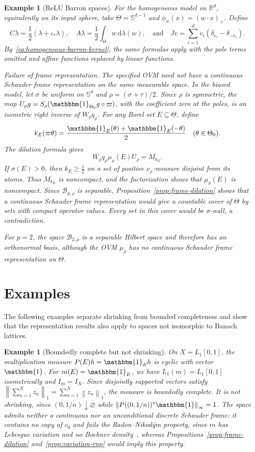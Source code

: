 \documentclass[11pt,leqno]{amsart}
\theoremstyle{compact}
\numberwithin{equation}{section}
\theoremstyle{compactremark}
\newtheorem{example}[theorem]{Example}
\theoremstyle{compact}
\newcommand{\1}{\mathbbm{1}}
\newcommand{\rmd}{\mathrm{d}}
\newcommand{\R}{\mathbb{R}}
\newcommand{\norm}[1]{\left\|#1\right\|}
\begin{document}
\begin{example}[ReLU Barron spaces]
For the homogeneous model on $\R^d$, equivalently on its input sphere, take $\Theta=\mathbb S^{d-1}$ and $\phi_w(x)=(w\cdot x)_+$. Define
\[
C\lambda=\frac{1}{2}(\lambda+\iota_*\lambda),\quad
A\lambda=\frac{1}{2}\int_\Theta w\,\rmd\lambda(w),\quad\text{and}\quad
Jv=\sum_{i=1}^dv_i(\delta_{e_i}-\delta_{-e_i}).
\]
By~\eqref{eq:homogeneous-barron-kernel}, the same formulas apply with the pole terms omitted and affine functions replaced by linear functions.

\textit{Failure of frame representation.}
\begingroup
The specified OVM need not have a continuous Schauder frame representation on the same measurable space. In the biased model, let $\sigma$ be uniform on $\mathbb S^d$ and $\rho=(\sigma+\tau)/2$. Since $\rho$ is symmetric, the map $U_\rho g=S_\rho(\1_{\Theta_0}g\circ\varpi)$, with the coefficient zero at the poles, is an isometric right inverse of $W_\rho q_\rho$. For any Borel set $E\subseteq\Theta$, define
\[
k_E(\varpi\theta)=\frac{\1_E(\theta)+\1_E(-\theta)}{2}\quad(\theta\in\Theta_0).
\]
The dilation formula gives
\[
W_\rho q_\rho\mu_\rho(E)U_\rho=M_{k_E}.
\]
If $\sigma(E)>0$, then $k_E\geq\frac{1}{2}$ on a set of positive $\nu_\rho$-measure disjoint from its atoms. Thus $M_{k_E}$ is noncompact, and the factorization shows that $\mu_\rho(E)$ is noncompact. Since $\mathcal B_{p,\rho}$ is separable, Proposition~\ref{prop:frame-dilation} shows that a continuous Schauder frame representation would give a countable cover of $\Theta$ by sets with compact operator values. Every set in this cover would be $\sigma$-null, a contradiction.
\par\endgroup
For $p=2$, the space $\mathcal B_{2,\rho}$ is a separable Hilbert space and therefore has an orthonormal basis, although the OVM $\mu_\rho$ has no continuous Schauder frame representation on $\Theta$.
\end{example}

\section{Examples}\label{sec:examples}

The following examples separate shrinking from bounded completeness and show that the representation results also apply to spaces not isomorphic to Banach lattices.

\begin{example}[Boundedly complete but not shrinking]\label{ex:l1-james}
On $X=L_1[0,1]$, the multiplication measure $P(E)h=\1_Eh$ is cyclic with vector $\1$. For $m(E)=\1_E$, we have $L_1(m)=L_1[0,1]$ isometrically and $I_m=I_X$. Since disjointly supported vectors satisfy $ \norm{\sum_{n=1}^Nz_n}_1=\sum_{n=1}^N\norm{z_n}_1$, the measure is boundedly complete. It is not shrinking, since $(0,1/n)\downarrow\varnothing$ while $\norm{P((0,1/n))^*\1}_\infty=1$. The space admits neither a continuous nor an unconditional discrete Schauder frame: it contains no copy of $c_0$ and fails the Radon--Nikod\'ym property, since $m$ has Lebesgue variation and no Bochner density~\cite[Chapter~III]{DiestelUhl1977}, whereas Propositions~\ref{prop:frame-dilation} and~\ref{prop:variation-rnp} would imply this property.
\end{example}
\end{document}
